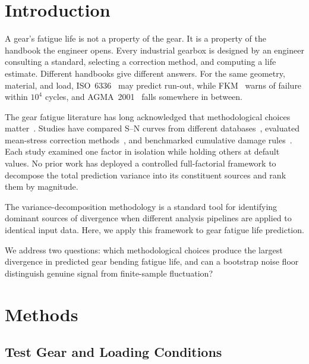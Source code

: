 \documentclass[12pt,a4paper]{article}
\begin{document}
\section{Introduction}
\label{sec:intro}

A gear's fatigue life is not a property of the gear. It is a property
of the handbook the engineer opens. Every industrial gearbox is designed
by an engineer consulting a standard, selecting a correction method, and
computing a life estimate. Different handbooks give different answers.
For the same geometry, material, and load, ISO~6336~\cite{iso6336} may
predict run-out, while FKM~\cite{fkm} warns of failure within $10^4$
cycles, and AGMA~2001~\cite{agma2001} falls somewhere in between.

The gear fatigue literature has long acknowledged that methodological
choices matter~\cite{stephens2001, dowling2013}. Studies have compared
S--N curves from different databases~\cite{waterloo_fde}, evaluated
mean-stress correction methods~\cite{dowling2009}, and benchmarked
cumulative damage rules~\cite{fatemi1998}. Each study examined one
factor in isolation while holding others at default values. No prior
work has deployed a controlled full-factorial framework to decompose
the total prediction variance into its constituent sources and rank
them by magnitude.

The variance-decomposition methodology is a standard tool for identifying
dominant sources of divergence when different analysis pipelines are
applied to identical input data. Here, we apply this framework to
gear fatigue life prediction.

We address two questions: which methodological choices produce the
largest divergence in predicted gear bending fatigue life, and can a
bootstrap noise floor distinguish genuine signal from finite-sample
fluctuation?

\section{Methods}
\label{sec:methods}

\subsection{Test Gear and Loading Conditions}
\end{document}
